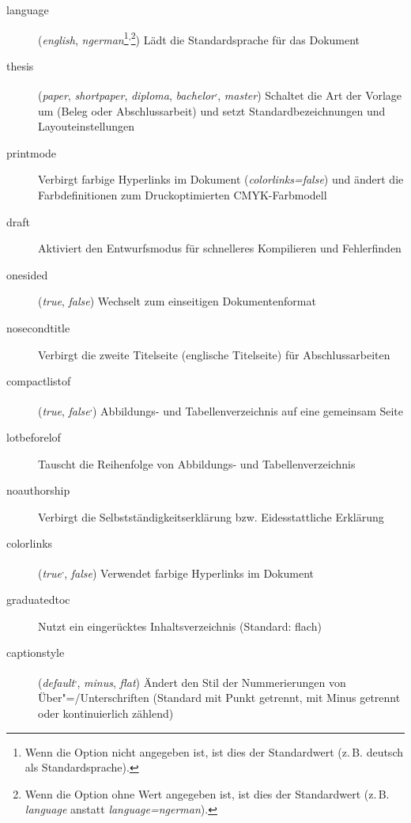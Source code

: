 	\begin{description}
		\item[language] (\textit{english}, \textit{ngerman}\footnote{\label{ftn:optionDefault}Wenn die Option nicht angegeben ist, ist dies der Standardwert (z.\,B. deutsch als Standardsprache).}\textsuperscript{,}\footnote{\label{ftn:optionDefaultValue}Wenn die Option ohne Wert angegeben ist, ist dies der Standardwert (z.\,B. \textit{language} anstatt \textit{language=ngerman}).}) Lädt die Standardsprache für das Dokument
		\item[thesis] (\textit{paper}, \textit{shortpaper}, \textit{diploma}, \textit{bachelor}\textsuperscript{,}, \textit{master}) Schaltet die Art der Vorlage um (Beleg oder Abschlussarbeit) und setzt Standardbezeichnungen und Layouteinstellungen
		\item[printmode] Verbirgt farbige Hyperlinks im Dokument (\textit{colorlinks=false}) und ändert die Farbdefinitionen zum Druckoptimierten CMYK-Farbmodell
		\item[draft] Aktiviert den Entwurfsmodus für schnelleres Kompilieren und Fehlerfinden
		\item[onesided] (\textit{true}, \textit{false}) Wechselt zum einseitigen Dokumentenformat
		\item[nosecondtitle] Verbirgt die zweite Titelseite (englische Titelseite) für Abschlussarbeiten
		\item[compactlistof] (\textit{true}, \textit{false}\textsuperscript{,}) Abbildungs- und Tabellenverzeichnis auf eine gemeinsam Seite
		\item[lotbeforelof] Tauscht die Reihenfolge von Abbildungs- und Tabellenverzeichnis
		\item[noauthorship] Verbirgt die Selbstständigkeitserklärung bzw. Eidesstattliche Erklärung
		\item[colorlinks] (\textit{true}\textsuperscript{,}, \textit{false}) Verwendet farbige Hyperlinks im Dokument
		\item[graduatedtoc] Nutzt ein eingerücktes Inhaltsverzeichnis (Standard: flach)
		\item[captionstyle] (\textit{default}\textsuperscript{,}, \textit{minus}, \textit{flat}) Ändert den Stil der Nummerierungen von Über"=/Unterschriften (Standard mit Punkt getrennt, mit Minus getrennt oder kontinuierlich zählend)

\end{description}

